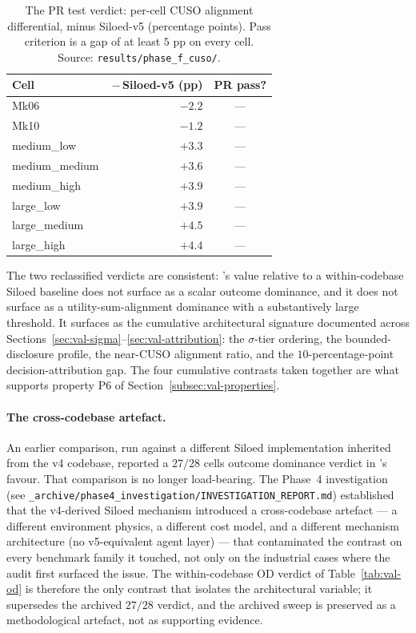 \begin{table}[ht]
\centering
\caption{The PR test verdict: per-cell CUSO alignment differential,
\NEXUS{} minus Siloed-v5 (percentage points). Pass criterion is a
gap of at least $5$ pp on every cell. Source:
\texttt{results/phase\_f\_cuso/}.}
\label{tab:val-pr}
\small
\begin{tabularx}{\textwidth}{@{}l r c@{}}
\toprule
\textbf{Cell} & \textbf{\NEXUS{}\,$-$\,Siloed-v5 (pp)} & \textbf{PR pass?} \\
\midrule
Mk06            & $-2.2$ & --- \\
Mk10            & $-1.2$ & --- \\
medium\_low     & $+3.3$ & --- \\
medium\_medium  & $+3.6$ & --- \\
medium\_high    & $+3.9$ & --- \\
large\_low      & $+3.9$ & --- \\
large\_medium   & $+4.5$ & --- \\
large\_high     & $+4.4$ & --- \\
\bottomrule
\end{tabularx}
\end{table}

The two reclassified verdicts are consistent: \NEXUS{}'s value
relative to a within-codebase Siloed baseline does not surface as a
scalar outcome dominance, and it does not surface as a
utility-sum-alignment dominance with a substantively large
threshold. It surfaces as the cumulative architectural signature
documented across Sections~\ref{sec:val-sigma}--\ref{sec:val-attribution}:
the $\sigma$-tier ordering, the bounded-disclosure profile, the
near-CUSO alignment ratio, and the
$10$-percentage-point decision-attribution gap. The four cumulative
contrasts taken together are what supports property P6 of
Section~\ref{subsec:val-properties}.

\paragraph{The cross-codebase artefact.}
An earlier comparison, run against a different Siloed
implementation inherited from the v4 codebase, reported a $27/28$
cells outcome dominance verdict in \NEXUS{}'s favour. That
comparison is no longer load-bearing. The Phase~4 investigation
(see \texttt{\_archive/phase4\_investigation/INVESTIGATION\_REPORT.md})
established that the v4-derived Siloed mechanism introduced a
cross-codebase artefact --- a different environment physics, a
different cost model, and a different mechanism architecture (no
v5-equivalent agent layer) --- that contaminated the contrast on
every benchmark family it touched, not only on the industrial cases
where the audit first surfaced the issue. The within-codebase OD
verdict of Table~\ref{tab:val-od} is therefore the only contrast
that isolates the architectural variable; it supersedes the archived
$27/28$ verdict, and the archived sweep is preserved as a
methodological artefact, not as supporting evidence.


